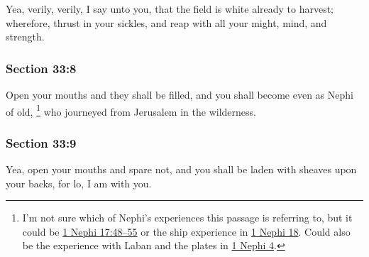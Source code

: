 		Yea, verily, verily, I say unto you, that the field is white already to harvest; wherefore, thrust in your sickles, and reap with all your might, mind, and strength.


	\subsubsection{Section 33:8} %
		\label{DC33-8}

		Open your mouths and they shall be filled, and you shall become even as Nephi of old,%
			\footnote{%
				I'm not sure which of Nephi's experiences this passage is referring to, but it could be \hyperref[1NEPHI-17-48]{1 Nephi 17:48--55} or the ship experience in \hyperref[1NEPHI-18]{1 Nephi 18}. Could also be the experience with Laban and the plates in \hyperref[1NEPHI-4]{1 Nephi 4}.
				}
		who journeyed from Jerusalem in the wilderness.


	\subsubsection{Section 33:9} %
		\label{DC33-9}

		Yea, open your mouths and spare not, and you shall be laden with sheaves upon your backs, for lo, I am with you.


